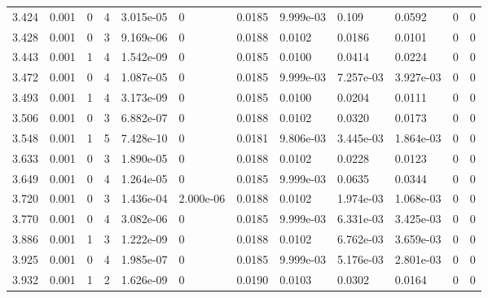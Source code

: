\documentclass[preview]{standalone}
\begin{document}
{{{\begin{tabular}{L{1.2cm}C{1.2cm} C{0.3cm}C{0.5cm} C{1.4cm}C{1.4cm} C{1.4cm}C{1.4cm} C{1.6cm}C{1.6cm} C{1.6cm}C{1.6cm}}
  3.424  &  0.001  & 0     &  4 &  3.015e-05  & 0  &  0.0185&   9.999e-03& 0.109 & 0.0592   &  0 & 0  \\ 
  3.428  &  0.001  & 0     &  3 &  9.169e-06  & 0  &  0.0188&   0.0102& 0.0186 & 0.0101   &  0 & 0  \\ 
  3.443  &  0.001  & 1     &  4 &  1.542e-09  & 0  &  0.0185&   0.0100& 0.0414 & 0.0224   &  0 & 0  \\ 
  3.472  &  0.001  & 0     &  4 &  1.087e-05  & 0  &  0.0185&   9.999e-03& 7.257e-03 & 3.927e-03   &  0 & 0  \\ 
  3.493  &  0.001  & 1     &  4 &  3.173e-09  & 0  &  0.0185&   0.0100& 0.0204 & 0.0111   &  0 & 0  \\ 
  3.506  &  0.001  & 0     &  3 &  6.882e-07  & 0  &  0.0188&   0.0102& 0.0320 & 0.0173   &  0 & 0  \\ 
  3.548  &  0.001  & 1     &  5 &  7.428e-10  & 0  &  0.0181&   9.806e-03& 3.445e-03 & 1.864e-03   &  0 & 0  \\ 
  3.633  &  0.001  & 0     &  3 &  1.890e-05  & 0  &  0.0188&   0.0102& 0.0228 & 0.0123   &  0 & 0  \\ 
  3.649  &  0.001  & 0     &  4 &  1.264e-05  & 0  &  0.0185&   9.999e-03& 0.0635 & 0.0344   &  0 & 0  \\ 
  3.720  &  0.001  & 0     &  3 &  1.436e-04  & 2.000e-06  &  0.0188&   0.0102& 1.974e-03 & 1.068e-03   &  0 & 0  \\ 
  3.770  &  0.001  & 0     &  4 &  3.082e-06  & 0  &  0.0185&   9.999e-03& 6.331e-03 & 3.425e-03   &  0 & 0  \\ 
  3.886  &  0.001  & 1     &  3 &  1.222e-09  & 0  &  0.0188&   0.0102& 6.762e-03 & 3.659e-03   &  0 & 0  \\ 
  3.925  &  0.001  & 0     &  4 &  1.985e-07  & 0  &  0.0185&   9.999e-03& 5.176e-03 & 2.801e-03   &  0 & 0  \\ 
  3.932  &  0.001  & 1     &  2 &  1.626e-09  & 0  &  0.0190&   0.0103& 0.0302 & 0.0164   &  0 & 0  \\ 
\hline 
\end{tabular} 

}}}
\end{document}
